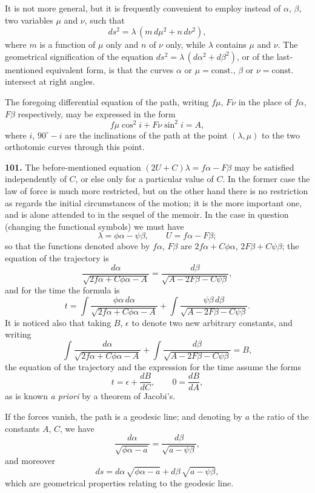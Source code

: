\documentclass[11pt,a4paper]{article}
\theoremstyle{definition}
\begin{document}
It is not more general, but it is frequently convenient to employ instead of $\alpha$, $\beta$, two variables $\mu$ and $\nu$, such that
\[
ds^2 = \lambda\,(m\,d\mu^2 + n\,d\nu^2),
\]
where $m$ is a function of $\mu$ only and $n$ of $\nu$ only, while $\lambda$ contains $\mu$ and $\nu$. The geometrical signification of the equation $ds^2 = \lambda\,(d\alpha^2 + d\beta^2)$, or of the last-mentioned equivalent form, is that the curves $\alpha$ or $\mu = \text{const.}$, $\beta$ or $\nu = \text{const.}$ intersect at right angles.

The foregoing differential equation of the path, writing $f\mu$, $F\nu$ in the place of $f\alpha$, $F\beta$ respectively, may be expressed in the form
\[
f\mu \cos^2 i + F\nu \sin^2 i = A,
\]
where $i$, $90^\circ - i$ are the inclinations of the path at the point $(\lambda, \mu)$ to the two orthotomic curves through this point.

\textbf{101.} The before-mentioned equation $(2U + C)\lambda = f\alpha - F\beta$ may be satisfied independently of $C$, or else only for a particular value of $C$. In the former case the law of force is much more restricted, but on the other hand there is no restriction as regards the initial circumstances of the motion; it is the more important one, and is alone attended to in the sequel of the memoir. In the case in question (changing the functional symbols) we must have
\[
\lambda = \phi\alpha - \psi\beta, \qquad U = f\alpha - F\beta;
\]
so that the functions denoted above by $f\alpha$, $F\beta$ are $2f\alpha + C\phi\alpha$, $2F\beta + C\psi\beta$; the equation of the trajectory is
\[
\frac{d\alpha}{\sqrt{2f\alpha + C\phi\alpha - A}} = \frac{d\beta}{\sqrt{A - 2F\beta - C\psi\beta}},
\]
and for the time the formula is
\[
t = \int \frac{\phi\alpha\,d\alpha}{\sqrt{2f\alpha + C\phi\alpha - A}} + \int \frac{\psi\beta\,d\beta}{\sqrt{A - 2F\beta - C\psi\beta}}.
\]
It is noticed also that taking $B$, $\epsilon$ to denote two new arbitrary constants, and writing
\[
\int \frac{d\alpha}{\sqrt{2f\alpha + C\phi\alpha - A}} + \int \frac{d\beta}{\sqrt{A - 2F\beta - C\psi\beta}} = B,
\]
the equation of the trajectory and the expression for the time assume the forms
\[
t = \epsilon + \frac{dB}{dC}, \qquad 0 = \frac{dB}{dA},
\]
as is known \textit{a priori} by a theorem of Jacobi's.

If the forces vanish, the path is a geodesic line; and denoting by $a$ the ratio of the constants $A$, $C$, we have
\[
\frac{d\alpha}{\sqrt{\phi\alpha - a}} = \frac{d\beta}{\sqrt{a - \psi\beta}},
\]
and moreover
\[
ds = d\alpha\,\sqrt{\phi\alpha - a} + d\beta\,\sqrt{a - \psi\beta},
\]
which are geometrical properties relating to the geodesic line.
\end{document}
